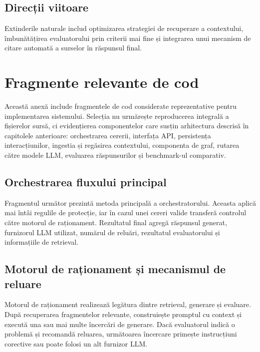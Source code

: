 \documentclass[12pt, a4paper, oneside, romanian]{teza-upb}
\begin{document}
\section{Direcții viitoare}
Extinderile naturale includ optimizarea strategiei de recuperare a contextului, îmbunătățirea evaluatorului prin criterii mai fine și integrarea unui mecanism de citare automată a surselor în răspunsul final.




\appendix
\chapter{Fragmente relevante de cod}

Această anexă include fragmentele de cod considerate reprezentative pentru implementarea sistemului. Selecția nu urmărește reproducerea integrală a fișierelor sursă, ci evidențierea componentelor care susțin arhitectura descrisă în capitolele anterioare: orchestrarea cererii, interfața API, persistența interacțiunilor, ingestia și regăsirea contextului, componenta de graf, rutarea către modele LLM, evaluarea răspunsurilor și benchmark-ul comparativ.

\section{Orchestrarea fluxului principal}

Fragmentul următor prezintă metoda principală a orchestratorului. Aceasta aplică mai întâi regulile de protecție, iar în cazul unei cereri valide transferă controlul către motorul de raționament. Rezultatul final agregă răspunsul generat, furnizorul LLM utilizat, numărul de reluări, rezultatul evaluatorului și informațiile de retrieval.

\label{anexa:orchestrator-flow}


\section{Motorul de raționament și mecanismul de reluare}

Motorul de raționament realizează legătura dintre retrieval, generare și evaluare. După recuperarea fragmentelor relevante, construiește promptul cu context și execută una sau mai multe încercări de generare. Dacă evaluatorul indică o problemă și recomandă reluarea, următoarea încercare primește instrucțiuni corective sau poate folosi un alt furnizor LLM.
\end{document}
